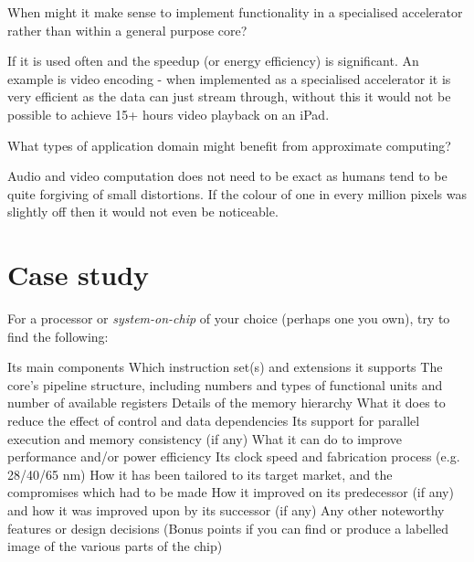 \documentclass{supervision}
\begin{document}
\begin{questions}
\begin{parts}
    \end{parts}
    \question
    When might it make sense to implement functionality in a specialised accelerator rather than within a general purpose core?
    \begin{solution}
    If it is used often and the speedup (or energy efficiency) is significant. An example is video encoding - when implemented as a specialised accelerator it is very efficient as the data can just stream through, without this it would not be possible to achieve 15+ hours video playback on an iPad.
    \end{solution}

    \question
    What types of application domain might benefit from approximate computing?
    \begin{solution}
    Audio and video computation does not need to be exact as humans tend to be quite forgiving of small distortions. If the colour of one in every million pixels was slightly off then it would not even be noticeable.
    \end{solution}


\end{questions}

\section*{Case study}

For a processor or \textit{system-on-chip} of your choice (perhaps one you own), try to find the following:

\begin{questions}
    \question
    Its main components
    \question
    Which instruction set(s) and extensions it supports
    \question
    The core's pipeline structure, including numbers and types of functional units and number of available registers
    \question
    Details of the memory hierarchy
    \question
    What it does to reduce the effect of control and data dependencies
    \question
    Its support for parallel execution and memory consistency (if any)
    \question
    What it can do to improve performance and/or power efficiency
    \question
    Its clock speed and fabrication process (e.g. 28/40/65 nm)
    \question
    How it has been tailored to its target market, and the compromises which had to be made
    \question
    How it improved on its predecessor (if any) and how it was improved upon by its successor (if any)
    \question
    Any other noteworthy features or design decisions
    \question
    (Bonus points if you can find or produce a labelled image of the various parts of the chip)
\end{questions}
\end{document}
